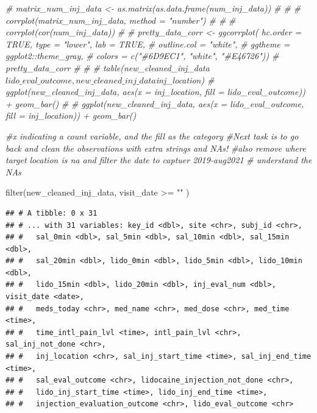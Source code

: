 \documentclass[
]{article}
\newenvironment{Shaded}{\begin{snugshade}}{\end{snugshade}}
\newcommand{\CommentTok}[1]{\textcolor[rgb]{0.56,0.35,0.01}{\textit{#1}}}
\newcommand{\FunctionTok}[1]{\textcolor[rgb]{0.00,0.00,0.00}{#1}}
\newcommand{\NormalTok}[1]{#1}
\newcommand{\SpecialCharTok}[1]{\textcolor[rgb]{0.00,0.00,0.00}{#1}}
\newcommand{\StringTok}[1]{\textcolor[rgb]{0.31,0.60,0.02}{#1}}
\begin{document}
\begin{Shaded}
\begin{Highlighting}[]
\CommentTok{\# matrix\_num\_inj\_data \textless{}{-} as.matrix(as.data.frame(num\_inj\_data))}
\CommentTok{\# \# }
\CommentTok{\# corrplot(matrix\_num\_inj\_data,  method = "number")}
\CommentTok{\# \# }
\CommentTok{\# corrplot(cor(num\_inj\_data))}
\CommentTok{\# }
\CommentTok{\# pretty\_data\_corr \textless{}{-} ggcorrplot( hc.order = TRUE, type = "lower", lab = TRUE,}
\CommentTok{\#                                outline.col = "white",}
\CommentTok{\#                                ggtheme     = ggplot2::theme\_gray,}
\CommentTok{\#                                colors      = c("\#6D9EC1", "white", "\#E46726"))}
\CommentTok{\# pretty\_data\_corr}
\CommentTok{\# }
\CommentTok{\# }
\CommentTok{\# table(new\_cleaned\_inj\_data$lido\_eval\_outcome, new\_cleaned\_inj\_data$inj\_location)}
\CommentTok{\# ggplot(new\_cleaned\_inj\_data, aes(x = inj\_location, fill = lido\_eval\_outcome)) + geom\_bar()}
\CommentTok{\# }
\CommentTok{\# ggplot(new\_cleaned\_inj\_data, aes(x = lido\_eval\_outcome, fill = inj\_location)) + geom\_bar()}

\CommentTok{\#x indicating a count variable, and the fill as the category}
\CommentTok{\#Next task is to go back and clean the observations with extra strings and NA\textquotesingle{}s!}
\CommentTok{\#also remove where target location is na and filter the date to captuer 2019{-}aug2021}
\CommentTok{\# understand the NAs}
\end{Highlighting}
\end{Shaded}

\begin{Shaded}
\begin{Highlighting}[]
\FunctionTok{filter}\NormalTok{(new\_cleaned\_inj\_data, visit\_date }\SpecialCharTok{\textgreater{}=} \StringTok{""}\NormalTok{ )}
\end{Highlighting}
\end{Shaded}

\begin{verbatim}
## # A tibble: 0 x 31
## # ... with 31 variables: key_id <dbl>, site <chr>, subj_id <chr>,
## #   sal_0min <dbl>, sal_5min <dbl>, sal_10min <dbl>, sal_15min <dbl>,
## #   sal_20min <dbl>, lido_0min <dbl>, lido_5min <dbl>, lido_10min <dbl>,
## #   lido_15min <dbl>, lido_20min <dbl>, inj_eval_num <dbl>, visit_date <date>,
## #   meds_today <chr>, med_name <chr>, med_dose <chr>, med_time <time>,
## #   time_intl_pain_lvl <time>, intl_pain_lvl <chr>, sal_inj_not_done <chr>,
## #   inj_location <chr>, sal_inj_start_time <time>, sal_inj_end_time <time>,
## #   sal_eval_outcome <chr>, lidocaine_injection_not_done <chr>,
## #   lido_inj_start_time <time>, lido_inj_end_time <time>,
## #   injection_evaluation_outcome <chr>, lido_eval_outcome <chr>
\end{verbatim}
\end{document}
